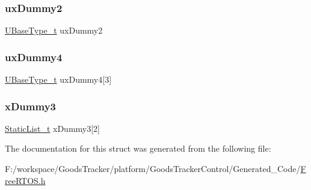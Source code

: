 \subsubsection{\texorpdfstring{ux\+Dummy2}{uxDummy2}}
{\footnotesize\ttfamily \hyperlink{portmacro_8h_a646f89d4298e4f5afd522202b11cb2e6}{U\+Base\+Type\+\_\+t} ux\+Dummy2}

\mbox{\label{structx_s_t_a_t_i_c___q_u_e_u_e_a8c2bd4532fb12e9c4ca67d2a5b0afc1a}} 
\subsubsection{\texorpdfstring{ux\+Dummy4}{uxDummy4}}
{\footnotesize\ttfamily \hyperlink{portmacro_8h_a646f89d4298e4f5afd522202b11cb2e6}{U\+Base\+Type\+\_\+t} ux\+Dummy4\mbox{[}3\mbox{]}}

\mbox{\label{structx_s_t_a_t_i_c___q_u_e_u_e_a2ea20ae87a814cd673deba85bbc35e5b}} 
\subsubsection{\texorpdfstring{x\+Dummy3}{xDummy3}}
{\footnotesize\ttfamily \hyperlink{_free_r_t_o_s_8h_a9735ad9101a2bd25f83a62089a4acee6}{Static\+List\+\_\+t} x\+Dummy3\mbox{[}2\mbox{]}}



The documentation for this struct was generated from the following file\+:\begin{DoxyCompactItemize}
\item 
F\+:/workspace/\+Goods\+Tracker/platform/\+Goods\+Tracker\+Control/\+Generated\+\_\+\+Code/\hyperlink{_free_r_t_o_s_8h}{Free\+R\+T\+O\+S.\+h}\end{DoxyCompactItemize}
